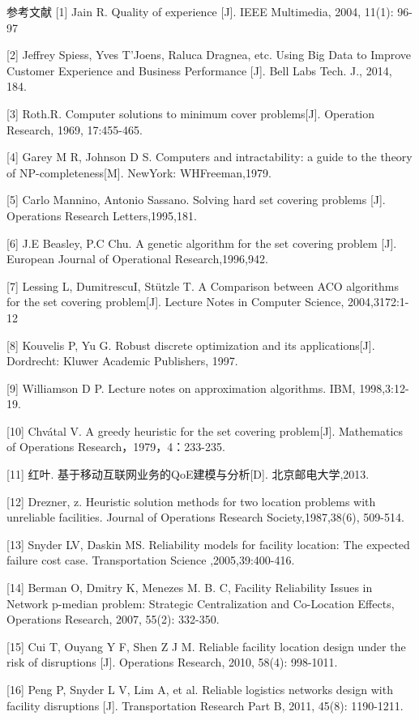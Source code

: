 \documentclass[10pt]{beamer}
\begin{document}
\begin{frame}[allowframebreaks]{参考文献}
[1] Jain R. Quality of experience [J]. IEEE Multimedia, 2004, 11(1): 96-97

[2] Jeffrey Spiess, Yves T’Joens, Raluca Dragnea, etc. Using Big Data to Improve Customer Experience and Business Performance [J]. Bell Labs Tech. J., 2014, 184.

[3] Roth.R. Computer solutions to minimum cover problems[J]. Operation Research, 1969, 17:455-465.

[4] Garey M R, Johnson D S. Computers and intractability: a guide to the theory of NP-completeness[M]. NewYork: WHFreeman,1979.

[5] Carlo Mannino, Antonio Sassano. Solving hard set covering problems [J]. Operations Research Letters,1995,181.

[6] J.E Beasley, P.C Chu. A genetic algorithm for the set covering problem [J]. European Journal of Operational Research,1996,942.

[7] Lessing L, DumitrescuI, Stützle T. A Comparison between ACO algorithms for the set covering problem[J]. Lecture Notes in Computer Science, 2004,3172:1-12

[8] Kouvelis P, Yu G. Robust discrete optimization and its applications[J]. Dordrecht: Kluwer Academic Publishers, 1997.

[9] Williamson D P. Lecture notes on approximation algorithms. IBM, 1998,3:12-19.

[10] Chvátal V. A greedy heuristic for the set covering problem[J]. Mathematics of Operations Research，1979，4：233-235.

[11] 红叶. 基于移动互联网业务的QoE建模与分析[D]. 北京邮电大学,2013.

[12] Drezner, z. Heuristic solution methods for two location problems with unreliable facilities. Journal of Operations Research Society,1987,38(6), 509-514.

[13] Snyder LV, Daskin MS. Reliability models for facility location: The expected failure cost case. Transportation Science ,2005,39:400-416.

[14] Berman O, Dmitry K, Menezes M. B. C, Facility Reliability Issues in Network p-median problem: Strategic Centralization and Co-Location Effects, Operations Research, 2007, 55(2): 332-350.

[15] Cui T, Ouyang Y F, Shen Z J M. Reliable facility location design under the risk of disruptions [J]. Operations Research, 2010, 58(4): 998-1011.

[16] Peng P, Snyder L V, Lim A, et al. Reliable logistics networks design with facility disruptions [J]. Transportation Research Part B, 2011, 45(8): 1190-1211.


\end{frame}
\end{document}

